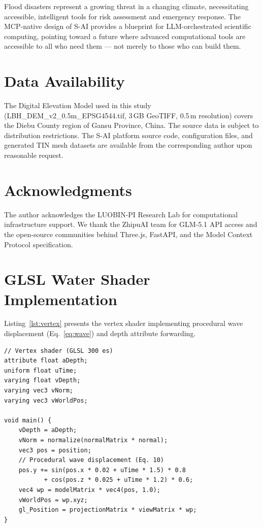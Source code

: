 \documentclass[11pt, a4paper]{article}
\begin{document}
Flood disasters represent a growing threat in a changing climate, necessitating accessible, intelligent tools for risk assessment and emergency response. The MCP-native design of S-AI provides a blueprint for LLM-orchestrated scientific computing, pointing toward a future where advanced computational tools are accessible to all who need them --- not merely to those who can build them.

\section*{Data Availability}

The Digital Elevation Model used in this study (LBH\_DEM\_v2\_0.5m\_EPSG4544.tif, 3\,GB GeoTIFF, 0.5\,m resolution) covers the Diebu County region of Gansu Province, China. The source data is subject to distribution restrictions. The S-AI platform source code, configuration files, and generated TIN mesh datasets are available from the corresponding author upon reasonable request.

\section*{Acknowledgments}

The author acknowledges the LUOBIN-PI Research Lab for computational infrastructure support. We thank the ZhipuAI team for GLM-5.1 API access and the open-source communities behind Three.js, FastAPI, and the Model Context Protocol specification.

\appendix
\section{GLSL Water Shader Implementation}
\label{app:shader}

Listing~\ref{lst:vertex} presents the vertex shader implementing procedural wave displacement (Eq.~\ref{eq:wave}) and depth attribute forwarding.

\begin{verbatim}
// Vertex shader (GLSL 300 es)
attribute float aDepth;
uniform float uTime;
varying float vDepth;
varying vec3 vNorm;
varying vec3 vWorldPos;

void main() {
    vDepth = aDepth;
    vNorm = normalize(normalMatrix * normal);
    vec3 pos = position;
    // Procedural wave displacement (Eq. 10)
    pos.y += sin(pos.x * 0.02 + uTime * 1.5) * 0.8
           + cos(pos.z * 0.025 + uTime * 1.2) * 0.6;
    vec4 wp = modelMatrix * vec4(pos, 1.0);
    vWorldPos = wp.xyz;
    gl_Position = projectionMatrix * viewMatrix * wp;
}
\end{verbatim}
\end{document}
